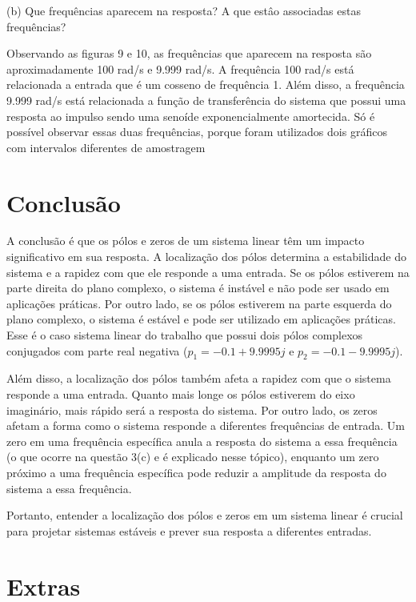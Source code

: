 \documentclass[10pt]{article}
\begin{document}
(b) Que frequências aparecem na resposta? A que estâo associadas estas frequências?

\quad Observando as figuras 9 e 10, as frequências que aparecem na resposta são aproximadamente 100 rad/s e 9.999 rad/s.
A frequência 100 rad/s está relacionada a entrada que é um cosseno de frequência 1.
Além disso, a frequência 9.999 rad/s está relacionada a função de transferência do sistema
que possui uma resposta ao impulso sendo uma senoíde exponencialmente amortecida.
Só é possível observar essas duas frequências,
porque foram utilizados dois gráficos com intervalos diferentes de amostragem


\newpage

\section{Conclusão}

\quad A conclusão é que os pólos e zeros de um sistema linear têm um impacto significativo em sua resposta.
A localização dos pólos determina a estabilidade do sistema e a rapidez com que ele responde a uma entrada.
Se os pólos estiverem na parte direita do plano complexo, o sistema é instável e não pode ser usado em aplicações práticas.
Por outro lado, se os pólos estiverem na parte esquerda do plano complexo, o sistema é estável e pode ser utilizado em aplicações práticas.
Esse é o caso sistema linear do trabalho que possui dois pólos complexos conjugados com parte real negativa ($p_1 = -0.1 + 9.9995j$ e $p_2 = -0.1 - 9.9995j$).

\quad Além disso, a localização dos pólos também afeta a rapidez com que o sistema responde a uma entrada.
Quanto mais longe os pólos estiverem do eixo imaginário, mais rápido será a resposta do sistema. Por outro lado,
os zeros afetam a forma como o sistema responde a diferentes frequências de entrada.
Um zero em uma frequência específica anula a resposta do sistema a essa frequência
(o que ocorre na questão 3(c) e é explicado nesse tópico),
enquanto um zero próximo a uma frequência específica pode reduzir a amplitude da resposta do sistema a essa frequência.

\quad Portanto, entender a localização dos pólos e zeros em um sistema linear é crucial para projetar sistemas estáveis e prever sua resposta a diferentes entradas.
\newpage

\section{Extras}
\end{document}
